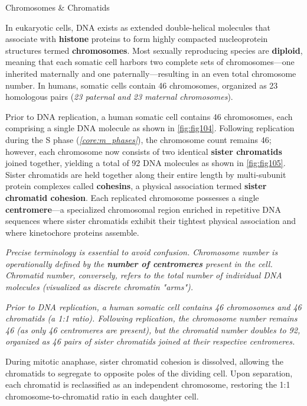\documentclass[10pt]{article}
\begin{document}
    \begin{core}{Chromosomes \& Chromatids}

      In eukaryotic cells, DNA exists as extended double-helical molecules that associate with \textbf{histone} proteins to form highly compacted nucleoprotein structures termed \textbf{chromosomes}. Most sexually reproducing species are \textbf{diploid}, meaning that each somatic cell harbors two complete sets of chromosomes---one inherited maternally and one paternally---resulting in an even total chromosome number. In humans, somatic cells contain 46 chromosomes, organized as 23 homologous pairs (\textit{23 paternal and 23 maternal chromosomes}).


      Prior to DNA replication, a human somatic cell contains 46 chromosomes, each comprising a single DNA molecule as shown in \autoref{fig:fig104}. Following replication during the S phase (\textit{\autoref{core:m_phases}}), the chromosome count remains 46; however, each chromosome now consists of two identical \textbf{sister chromatids} joined together, yielding a total of 92 DNA molecules as shown in \autoref{fig:fig105}. Sister chromatids are held together along their entire length by multi-subunit protein complexes called \textbf{cohesins}, a physical association termed \textbf{sister chromatid cohesion}. Each replicated chromosome possesses a single \textbf{centromere}---a specialized chromosomal region enriched in repetitive DNA sequences where sister chromatids exhibit their tightest physical association and where kinetochore proteins assemble.


      \textit{Precise terminology is essential to avoid confusion. Chromosome number is operationally defined by the \textbf{number of centromeres} present in the cell. Chromatid number, conversely, refers to the total number of individual DNA molecules (visualized as discrete chromatin "arms").}

      \textit{Prior to DNA replication, a human somatic cell contains 46 chromosomes and 46 chromatids (a 1:1 ratio). Following replication, the chromosome number remains 46 (as only 46 centromeres are present), but the chromatid number doubles to 92, organized as 46 pairs of sister chromatids joined at their respective centromeres.}

      During mitotic anaphase, sister chromatid cohesion is dissolved, allowing the chromatids to segregate to opposite poles of the dividing cell. Upon separation, each chromatid is reclassified as an independent chromosome, restoring the 1:1 chromosome-to-chromatid ratio in each daughter cell.

    \end{core}
\end{document}
